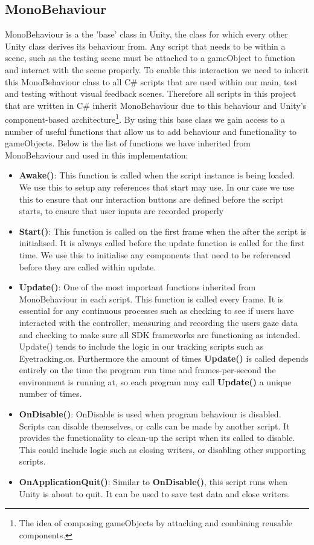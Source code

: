 \documentclass{l4proj}
\begin{document}
\subsection{MonoBehaviour}
MonoBehaviour is a the 'base' class in Unity, the class for which every other Unity class derives its behaviour from. Any script that needs to be within a scene, such as the testing scene must be attached to a gameObject to function and interact with the scene properly. To enable this interaction we need to inherit this MonoBehaviour class to all C\# scripts that are used within our main, test and testing without visual feedback scenes.  Therefore all scripts in this project that are written in C\# inherit MonoBehaviour due to this behaviour and Unity's component-based architecture\footnote{The idea of composing gameObjects by attaching and combining reusable components.}. By using this base class we gain access to a number of useful functions that allow us to add behaviour and functionality to gameObjects. Below is the list of functions we have inherited from MonoBehaviour and used in this implementation: 
\begin{itemize}
    \item \textbf{Awake()}: This function is called when the script instance is being loaded. We use this to setup any references that start may use. In our case we use this to ensure that our interaction buttons are defined before the script starts, to ensure that user inputs are recorded properly
    \item \textbf{Start()}: This function is called on the first frame when the after the script is initialised. It is always called before the update function is called for the first time. We use this to initialise any components that need to be referenced before they are called within update.
    \item \textbf{Update()}: One of the most important functions inherited from MonoBehaviour in each script. This function is called every frame. It is essential for any continuous processes such as checking to see if users have interacted with the controller, measuring and recording the users gaze data and checking to make sure all SDK frameworks are functioning as intended. Update() tends to include the logic in our tracking scripts such as Eyetracking.cs. Furthermore the amount of times \textbf{Update()} is called depends entirely on the time the program  run time and frames-per-second the environment is running at, so each program may call \textbf{Update()} a unique number of times.
    \item \textbf{OnDisable()}: OnDisable is used when program behaviour is disabled. Scripts can disable themselves, or calls can be made by another script. It provides the functionality to clean-up the script when its called to disable. This could include logic such as closing writers, or disabling other supporting scripts.
    \item \textbf{OnApplicationQuit()}: Similar to \textbf{OnDisable()}, this script runs when Unity is about to quit. It can be used to save test data and close writers.
\end{itemize}
\end{document}
